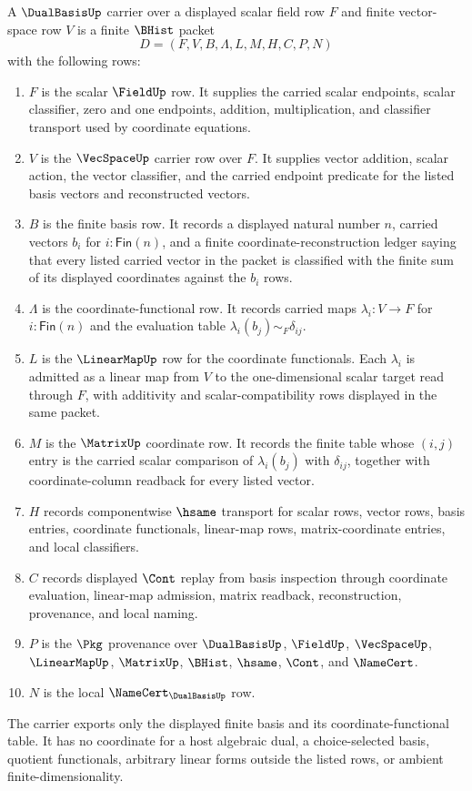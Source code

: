\begin{definition}
\label{def:dual-basis-carrier}
A $\DualBasisUp$ carrier over a displayed scalar field row $F$ and finite vector-space row $V$ is a finite $\BHist$ packet
$$
D=(F,V,B,\Lambda,L,M,H,C,P,N)
$$
with the following rows:
\begin{enumerate}
\item $F$ is the scalar $\FieldUp$ row. It supplies the carried scalar endpoints, scalar classifier, zero and one endpoints, addition, multiplication, and classifier transport used by coordinate equations.
\item $V$ is the $\VecSpaceUp$ carrier row over $F$. It supplies vector addition, scalar action, the vector classifier, and the carried endpoint predicate for the listed basis vectors and reconstructed vectors.
\item $B$ is the finite basis row. It records a displayed natural number $n$, carried vectors $b_i$ for $i:\mathsf{Fin}(n)$, and a finite coordinate-reconstruction ledger saying that every listed carried vector in the packet is classified with the finite sum of its displayed coordinates against the $b_i$ rows.
\item $\Lambda$ is the coordinate-functional row. It records carried maps $\lambda_i:V\to F$ for $i:\mathsf{Fin}(n)$ and the evaluation table $\lambda_i(b_j)\sim_F \delta_{ij}$.
\item $L$ is the $\LinearMapUp$ row for the coordinate functionals. Each $\lambda_i$ is admitted as a linear map from $V$ to the one-dimensional scalar target read through $F$, with additivity and scalar-compatibility rows displayed in the same packet.
\item $M$ is the $\MatrixUp$ coordinate row. It records the finite table whose $(i,j)$ entry is the carried scalar comparison of $\lambda_i(b_j)$ with $\delta_{ij}$, together with coordinate-column readback for every listed vector.
\item $H$ records componentwise $\hsame$ transport for scalar rows, vector rows, basis entries, coordinate functionals, linear-map rows, matrix-coordinate entries, and local classifiers.
\item $C$ records displayed $\Cont$ replay from basis inspection through coordinate evaluation, linear-map admission, matrix readback, reconstruction, provenance, and local naming.
\item $P$ is the $\Pkg$ provenance over $\DualBasisUp$, $\FieldUp$, $\VecSpaceUp$, $\LinearMapUp$, $\MatrixUp$, $\BHist$, $\hsame$, $\Cont$, and $\NameCert$.
\item $N$ is the local $\NameCert_{\DualBasisUp}$ row.
\end{enumerate}
The carrier exports only the displayed finite basis and its coordinate-functional table. It has no coordinate for a host algebraic dual, a choice-selected basis, quotient functionals, arbitrary linear forms outside the listed rows, or ambient finite-dimensionality.
\end{definition}

